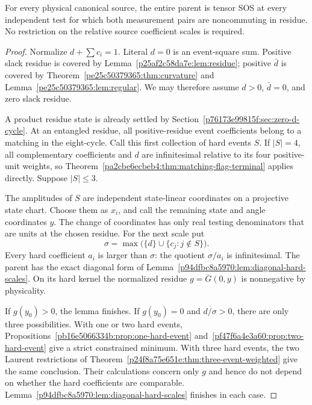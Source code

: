 \begin{theorem}
\label{p94dfbc8a5970:thm:all-noncommuting}
For every physical canonical source, the entire parent is tensor SOS at every independent test for which both measurement pairs are noncommuting in residue. No restriction on the relative source coefficient scales is required.
\end{theorem}
\begin{proof}
Normalize $d+\sum c_i=1$. Literal $d=0$ is an event-square sum. Positive slack residue is covered by Lemma~\ref{p25af2c58da7e:lem:residue}; positive $\bar d$ is covered by Theorem~\ref{pe25c50379365:thm:curvature} and Lemma~\ref{pe25c50379365:lem:regular}. We may therefore assume $d>0$, $\bar d=0$, and zero slack residue.

A product residue state is already settled by Section~\ref{p76173e99815f:sec:zero-d-cycle}. At an entangled residue, all positive-residue event coefficients belong to a matching in the eight-cycle. Call this first collection of hard events $S$. If $|S|=4$, all complementary coefficients and $d$ are infinitesimal relative to its four positive-unit weights, so Theorem~\ref{pa2cbe6ecbeb4:thm:matching-flag-terminal} applies directly. Suppose $|S|\le3$.

The amplitudes of $S$ are independent state-linear coordinates on a projective state chart. Choose them as $x_i$, and call the remaining state and angle coordinates $y$. The change of coordinates has only real testing denominators that are units at the chosen residue. For the next scale put
\[
\sigma=\max\bigl(\{d\}\cup\{c_j:j\notin S\}\bigr).
\]
Every hard coefficient $a_i$ is larger than $\sigma$: the quotient $\sigma/a_i$ is infinitesimal. The parent has the exact diagonal form of Lemma~\ref{p94dfbc8a5970:lem:diagonal-hard-scales}. On its hard kernel the normalized residue $g=\overline G(0,y)$ is nonnegative by physicality.

If $g(y_0)>0$, the lemma finishes. If $g(y_0)=0$ and $\overline{d/\sigma}>0$, there are only three possibilities. With one or two hard events, Propositions~\ref{pb16e5066334b:prop:one-hard-event} and~\ref{pf47f6a4e3a60:prop:two-hard-event} give a strict constrained minimum. With three hard events, the two Laurent restrictions of Theorem~\ref{p24f8a75e651e:thm:three-event-weighted} give the same conclusion. Their calculations concern only $g$ and hence do not depend on whether the hard coefficients are comparable. Lemma~\ref{p94dfbc8a5970:lem:diagonal-hard-scales} finishes in each case.


\end{proof}
